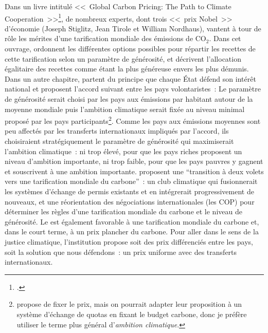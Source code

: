 \documentclass[a5paper,french]{memoir}
\begin{document}
Dans un livre intitulé <<~Global Carbon Pricing: The Path to Climate Cooperation~>>\footnote{\citet{cramton_global_2017}.}, de nombreux experts, dont trois <<~prix Nobel~>> d'économie (Joseph Stiglitz, Jean Tirole et William Nordhaus), vantent à tour de rôle les mérites d'une tarification mondiale des émissions de CO$_\text{2}$. Dans cet ouvrage, \citet{gollier_negotiating_2015} ordonnent les différentes options possibles pour répartir les recettes de cette tarification selon un paramètre de générosité, et décrivent l'allocation égalitaire des recettes comme étant la plus généreuse envers les plus démunis. Dans un autre chapitre, \citet{cramton_international_2015} partent du principe que chaque État défend son intérêt national et proposent l'accord suivant entre les pays %
volontaristes~: Le paramètre de générosité serait choisi par les pays aux émissions par habitant autour de la moyenne mondiale puis l'ambition climatique serait fixée au niveau minimal proposé par les pays participants\footnote{\citet{cramton_international_2015} propose de fixer le prix, mais on pourrait adapter leur proposition à un système d'échange de quotas en fixant le budget carbone, donc je préfère utiliser le terme plus général d'\textit{ambition climatique}.}. Comme les pays aux émissions moyennes sont peu affectés par les transferts internationaux impliqués par l'accord, ils choisiraient stratégiquement le paramètre de générosité qui maximiserait l'ambition climatique~: ni trop élevé, pour que les pays riches proposent un niveau d'ambition importante, ni trop faible, pour que les pays pauvres y gagnent et souscrivent à une ambition importante. \citet{van_den_berg_implications_2020} proposent une ``transition à deux volets vers une tarification mondiale du carbone''~: un club climatique qui fusionnerait les systèmes d'échange de permis existants et en intégrerait progressivement de nouveaux, et une réorientation des négociations internationales (les COP) pour déterminer les règles d'une tarification mondiale du carbone et le niveau de générosité. Le \citet{imf_how_2019} est également favorable à une tarification mondiale du carbone et, dans le court terme, à un prix plancher du carbone. Pour aller dans le sens de la justice climatique, l'institution propose soit des prix différenciés entre les pays, soit la solution que nous défendons~: un prix uniforme avec des transferts internationaux. 

\end{document}
